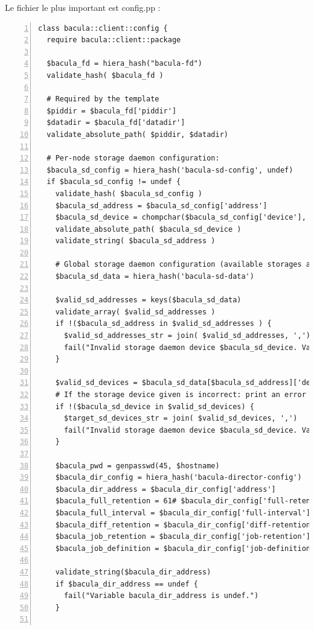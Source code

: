 \documentclass[14 pt]{extreport}
\begin{document}
Le fichier le plus important est config.pp : 

\begin{framed}
\begin{Verbatim}[fontsize=\tiny,numbers=left]
class bacula::client::config {
  require bacula::client::package

  $bacula_fd = hiera_hash("bacula-fd")
  validate_hash( $bacula_fd )

  # Required by the template
  $piddir = $bacula_fd['piddir']
  $datadir = $bacula_fd['datadir']
  validate_absolute_path( $piddir, $datadir)

  # Per-node storage daemon configuration:
  $bacula_sd_config = hiera_hash('bacula-sd-config', undef)
  if $bacula_sd_config != undef {
    validate_hash( $bacula_sd_config )
    $bacula_sd_address = $bacula_sd_config['address']
    $bacula_sd_device = chompchar($bacula_sd_config['device'], "/")
    validate_absolute_path( $bacula_sd_device )
    validate_string( $bacula_sd_address )

    # Global storage daemon configuration (available storages and devices)
    $bacula_sd_data = hiera_hash('bacula-sd-data')

    $valid_sd_addresses = keys($bacula_sd_data)
    validate_array( $valid_sd_addresses )
    if !($bacula_sd_address in $valid_sd_addresses ) {
      $valid_sd_addresses_str = join( $valid_sd_addresses, ',')
      fail("Invalid storage daemon device $bacula_sd_device. Valids are '$target_sd_devices_str'")
    }

    $valid_sd_devices = $bacula_sd_data[$bacula_sd_address]['devices']
    # If the storage device given is incorrect: print an error and fail the compilation
    if !($bacula_sd_device in $valid_sd_devices) {
      $target_sd_devices_str = join( $valid_sd_devices, ',')
      fail("Invalid storage daemon device $bacula_sd_device. Valids are '$target_sd_devices_str'")
    }

	$bacula_pwd = genpasswd(45, $hostname)
    $bacula_dir_config = hiera_hash('bacula-director-config')
    $bacula_dir_address = $bacula_dir_config['address']
    $bacula_full_retention = 61# $bacula_dir_config['full-retention'].scanf("%i")
    $bacula_full_interval = $bacula_dir_config['full-interval']
    $bacula_diff_retention = $bacula_dir_config['diff-retention']
    $bacula_job_retention = $bacula_dir_config['job-retention']
    $bacula_job_definition = $bacula_dir_config['job-definition']

    validate_string($bacula_dir_address)
    if $bacula_dir_address == undef {
      fail("Variable bacula_dir_address is undef.")
    }


\end{Verbatim}
\end{framed}
\end{document}
